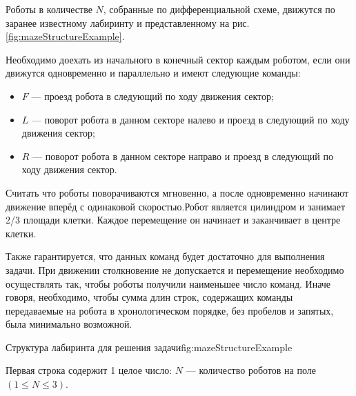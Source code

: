 
Роботы в количестве $N$, собранные по дифференциальной схеме, движутся по заранее известному лабиринту и
представленному на рис. \ref{fig:mazeStructureExample}.

Необходимо доехать из начального в конечный сектор каждым роботом, если они
движутся одновременно и параллельно и имеют следующие команды:
\begin{itemize}
    \item $F$ --- проезд робота в следующий по ходу движения сектор;
    \item $L$ --- поворот робота в данном секторе налево и проезд в следующий по ходу движения сектор;
    \item $R$ --- поворот робота в данном секторе направо и проезд в следующий по ходу движения сектор.
\end{itemize}
Считать что роботы поворачиваются мгновенно, а после одновременно начинают движение вперёд с 
одинаковой скоростью.Робот является цилиндром и занимает 2/3 площади клетки. Каждое перемещение он начинает и 
заканчивает в центре клетки.

Также гарантируется, что данных команд будет достаточно для выполнения задачи. При движении столкновение не 
допускается и перемещение необходимо осуществлять так, чтобы роботы получили наименьшее число команд. Иначе 
говоря, необходимо, чтобы сумма длин строк, содержащих команды передаваемые на робота в хронологическом порядке, 
без пробелов и запятых, была минимально возможной.

{Структура лабиринта для решения задачи}{fig:mazeStructureExample}


Первая строка содержит 1 целое число: $N$ --- количество роботов на поле \linebreak $(1 \leq N \leq 3)$.

